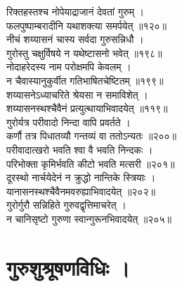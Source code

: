 रिक्तहस्तश्च नोपेयाद्राजानं देवतां गुरुम् ।\\[-2mm]
फलपुष्पाम्बरादीनि यथाशक्त्या समर्पयेत् ॥१२०॥\\ 
नीचं शय्यासनं चास्य सर्वदा गुरुसन्निधौ ।\\[-2mm]
गुरोस्तु चक्षुर्विषये न यथेष्टासनो भवेत् ॥१९८॥\\
नोदाहरेदस्य नाम परोक्षमपि केवलम् ।\\[-2mm]
न चैवास्यानुकुर्वीत गतिभाषितचेष्टितम् ॥१९९॥\\
शय्यासनेऽध्याचरिते श्रेयसा न समाविशेत् ।\\[-2mm]
शय्यासनस्थश्चैवैनं प्रत्युत्थायाभिवादयेत् ॥११९॥\\
गुरोर्यत्र परीवादो निन्दा वापि प्रवर्तते ।\\[-2mm]
कर्णौ तत्र पिधातव्यौ गन्तव्यं वा ततोऽन्यतः ॥२००॥\\
परीवादात्खरो भवति श्वा वै भवति निन्दकः ।\\[-2mm]
परिभोक्ता कृमिर्भवति कीटो भवति मत्सरी ॥२०१॥\\
दूरस्थो नार्चयेदेनं न क्रुद्धो नान्तिके स्त्रियाः ।\\[-2mm]
यानासनस्थश्चैवैनमवरुह्याभिवादयेत् ॥२०२॥\\
गुरोर्गुरौ सन्निहिते गुरुवद्वृत्तिमाचरेत् ।\\[-2mm]
न चानिसृष्टो गुरुणा स्वान्गुरूनभिवादयेत् ॥२०५॥\\

\section{गुरुशुश्रूषणविधिः ।}


